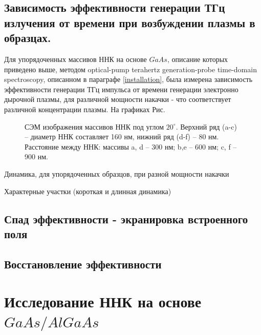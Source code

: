 \documentclass[a4paper,14pt,russian]{extreport}
\begin{document}
			\subsection{Зависимость эффективности генерации ТГц излучения от времени при возбуждении плазмы в образцах.}
				Для упорядоченных массивов ННК на основе $GaAs$, описание которых приведено выше, методом optical-pump terahertz generation-probe time-domain\\ spectroscopy, описанном в параграфе \ref{installation}, была измерена зависимость эффективности генерации ТГц импульса от времени генерации электронно дырочной плазмы, для различной мощности накачки - что соответствует различной концентрации плазмы. На графиках Рис. 
				\begin{figure}[H]
					\caption{СЭМ изображения массивов ННК под углом $20^\circ$. Верхний ряд (a-c) – диаметр ННК составляет 160 нм, нижний ряд (d-f) – 80 нм. Расстояние между ННК: массивы a, d – 300 нм; b,e – 600 нм; c, f – 900 нм.}
				\label{ris:OrderedSamples}
				\end{figure}
				Динамика, для упорядоченных образцов,
				при разной мощности накачки\par
				Характерные участки (короткая и длинная
				динамика)\par
			\subsection{Спад эффективности - экранировка встроенного поля}
			\subsection{Восстановление эффективности}
		\section{Исследование ННК на основе $GaAs/AlGaAs$}
\end{document}
